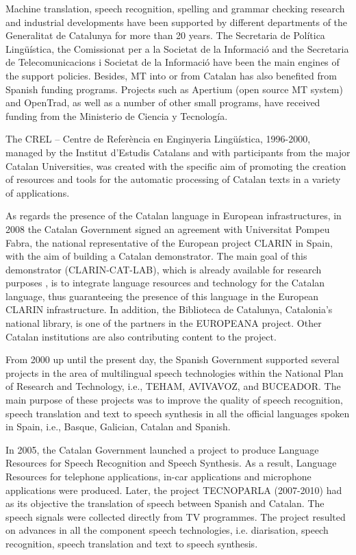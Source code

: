 \begin{multicols}{2}
Machine translation, speech recognition, spelling and grammar checking research and industrial developments have been supported by different departments of the Generalitat de Catalunya for more than 20 years. The Secretaria de Política Lingüística, the Comissionat per a la Societat de la Informació and the Secretaria de Telecomunicacions i Societat de la Informació have been the main engines of the support policies. Besides, MT into or from Catalan has also benefited from Spanish funding programs. Projects such as Apertium (open source MT system) and OpenTrad, as well as a number of other small programs, have received funding from the Ministerio de Ciencia y Tecnología. 

The CREL – Centre de Referència en Enginyeria Lingüística, 1996-2000, managed by the Institut d’Estudis Catalans and with participants from the major Catalan Universities, was created with the specific aim of promoting the creation of resources and tools for the automatic processing of Catalan texts in a variety of applications. 

As regards the presence of the Catalan language in European infrastructures, in 2008 the Catalan Government signed an agreement with Universitat Pompeu Fabra, the national representative of the European project CLARIN in Spain, with the aim of building a Catalan demonstrator. The main goal of this demonstrator (CLARIN-CAT-LAB), which is already available for research purposes \cite{CAT-Nota30}, is to integrate language resources and technology for the Catalan language, thus guaranteeing the presence of this language in the European CLARIN infrastructure. In addition, the Biblioteca de Catalunya, Catalonia’s national library, is one of the partners in the EUROPEANA project. Other Catalan institutions are also contributing content to the project.

From 2000 up until the present day, the Spanish Government supported several projects in the area of multilingual speech technologies within the National Plan of Research and Technology, i.e., TEHAM, AVIVAVOZ, and BUCEADOR. The main purpose of these projects was to improve the quality of speech recognition, speech translation and text to speech synthesis in all the official languages spoken in Spain, i.e., Basque, Galician, Catalan and Spanish.

In 2005, the Catalan Government launched a project to produce Language Resources for Speech Recognition and Speech Synthesis. As a result, Language Resources for telephone applications, in-car applications and microphone applications were produced. Later, the project TECNOPARLA (2007-2010) had as its objective the translation of speech between Spanish and Catalan. The speech signals were collected directly from TV programmes. The project resulted on advances in all the component speech technologies, i.e.  diarisation, speech recognition, speech translation and text to speech synthesis.
  

\end{multicols}
